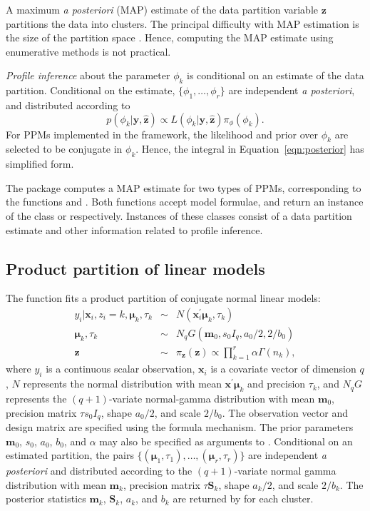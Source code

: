 \documentclass[article, nojss]{jss}
\newcommand{\bz}{\boldsymbol{z}}
\newcommand{\bmu}{\boldsymbol{\mu}}
\newcommand{\bx}{\boldsymbol{x}}
\newcommand{\by}{\boldsymbol{y}}
\newcommand{\bm}{\boldsymbol{m}}
\newcommand{\bS}{\boldsymbol{S}}
\begin{document}
A maximum {\it a posteriori} (MAP) estimate of the data partition variable $\bz$ partitions the data into clusters. The principal difficulty with MAP estimation is the size of the partition space \citep[see the `Bell number',][]{Bell1934, Rota1964}. Hence, computing the MAP estimate using enumerative methods is not practical.


{\it Profile inference} about the parameter $\phi_k$ is conditional on an estimate of the data partition. Conditional on the estimate, $\{\phi_1, \ldots, \phi_r\}$ are independent {\it a posteriori}, and distributed according to 
\begin{displaymath}
p(\phi_k | \by, \hat{\bz}) \propto L(\phi_k|\by, \hat{\bz}) \pi_{\phi}(\phi_k).
\end{displaymath}
For PPMs implemented in the  framework, the likelihood and prior over $\phi_k$ are selected to be conjugate in $\phi_k$. Hence, the integral in Equation~\ref{eqn:posterior} has simplified form.

The  package computes a MAP estimate for two types of PPMs, corresponding to the  functions  and . Both functions accept model formulae, and return an instance of the class  or  respectively. Instances of these classes consist of a data partition estimate and other information related to profile inference. 

\subsection{Product partition of linear models}

The  function fits a product partition of conjugate normal linear models:
\begin{eqnarray}
y_i | \bx_i, z_i = k, \bmu_k, \tau_k & \sim & N(\bx_i^{\prime}\bmu_k, \tau_k) \nonumber \\
\bmu_k, \tau_k & \sim & N_qG(\bm_0, s_0I_q, a_0/2, 2/b_0) \nonumber \\
\bz & \sim & \pi_{\bz}(\bz) \propto \prod_{k=1}^r \alpha \Gamma(n_k),
\end{eqnarray}
where $y_i$ is a continuous scalar observation, $\bx_i$ is a covariate vector of dimension $q$, $N$ represents the normal distribution with mean $\bx^{\prime}\bmu_k$ and precision $\tau_k$, and $N_qG$ represents the $(q+1)$-variate normal-gamma distribution with mean $\bm_0$, precision matrix $\tau s_0I_q$, shape $a_0/2$, and scale $2/b_0$. The observation vector and design matrix are specified using the  formula mechanism. The prior parameters $\bm_0$, $s_0$, $a_0$, $b_0$, and $\alpha$ may also be specified as arguments to . Conditional on an estimated partition, the pairs $\{(\bmu_1, \tau_1), \ldots, (\bmu_r, \tau_r)\}$ are independent {\it a posteriori} and distributed according to the $(q+1)$-variate normal gamma distribution with mean $\bm_k$, precision matrix $\tau\bS_k$, shape $a_k/2$, and scale $2/b_k$. The posterior statistics $\bm_k$, $\bS_k$, $a_k$, and $b_k$ are returned by  for each cluster.
\end{document}

